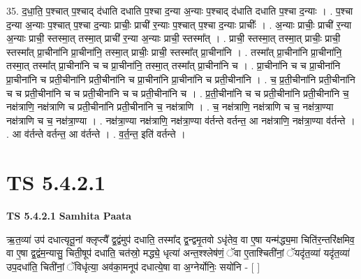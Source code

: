 \documentclass[17pt]{extarticle}
\begin{document}
35. द॒धा॒ति॒ प॒श्चात् प॒श्चाद् द॑धाति दधाति प॒श्चा द॒न्या अ॒न्याः प॒श्चाद् द॑धाति दधाति प॒श्चा द॒न्याः । . प॒श्चा द॒न्या अ॒न्याः प॒श्चात् प॒श्चा द॒न्याः प्राचीः॒ प्राची॑ र॒न्याः प॒श्चात् प॒श्चा द॒न्याः प्राचीः᳚ । . अ॒न्याः प्राचीः॒ प्राची॑ र॒न्या अ॒न्याः प्राची॒ स्तस्मा॒त् तस्मा॒त् प्राची॑ र॒न्या अ॒न्याः प्राची॒ स्तस्मा᳚त् । . प्राची॒ स्तस्मा॒त् तस्मा॒त् प्राचीः॒ प्राची॒ स्तस्मा᳚त् प्रा॒चीना॑नि प्रा॒चीना॑नि॒ तस्मा॒त् प्राचीः॒ प्राची॒ स्तस्मा᳚त् प्रा॒चीना॑नि । . तस्मा᳚त् प्रा॒चीना॑नि प्रा॒चीना॑नि॒ तस्मा॒त् तस्मा᳚त् प्रा॒चीना॑नि च च प्रा॒चीना॑नि॒ तस्मा॒त् तस्मा᳚त् प्रा॒चीना॑नि च । . प्रा॒चीना॑नि च च प्रा॒चीना॑नि प्रा॒चीना॑नि च प्रती॒चीना॑नि प्रती॒चीना॑नि च प्रा॒चीना॑नि प्रा॒चीना॑नि च प्रती॒चीना॑नि । . च॒ प्र॒ती॒चीना॑नि प्रती॒चीना॑नि च च प्रती॒चीना॑नि च च प्रती॒चीना॑नि च च प्रती॒चीना॑नि च । . प्र॒ती॒चीना॑नि च च प्रती॒चीना॑नि प्रती॒चीना॑नि च॒ नक्ष॑त्राणि॒ नक्ष॑त्राणि च प्रती॒चीना॑नि प्रती॒चीना॑नि च॒ नक्ष॑त्राणि । . च॒ नक्ष॑त्राणि॒ नक्ष॑त्राणि च च॒ नक्ष॑त्रा॒ण्या नक्ष॑त्राणि च च॒ नक्ष॑त्रा॒ण्या । . नक्ष॑त्रा॒ण्या नक्ष॑त्राणि॒ नक्ष॑त्रा॒ण्या व॑र्तन्ते वर्तन्त॒ आ नक्ष॑त्राणि॒ नक्ष॑त्रा॒ण्या व॑र्तन्ते । . आ व॑र्तन्ते वर्तन्त॒ आ व॑र्तन्ते । . व॒र्त॒न्त॒ इति॑ वर्तन्ते । \newline
\pagebreak
{}

\section{ TS 5.4.2.1 }

\textbf{TS 5.4.2.1 } \newline
\textbf{Samhita Paata} \newline

ऋ॒त॒व्या॑ उप॑ दधात्यृतू॒नां क्लृप्त्यै᳚ द्व॒द्वंमुप॑ दधाति॒ तस्मा᳚द् द्व॒न्द्वमृ॒तवो ऽधृ॑तेव॒ वा ए॒षा यन्म॑द्ध्य॒मा चिति॑र॒न्तरि॑क्षमिव॒ वा ए॒षा द्व॒द्वंम॒न्यासु॒ चिती॒षूप॑ दधाति॒ चत॑स्रो॒ मद्ध्ये॒ धृत्या॑ अन्त॒श्श्लेष॑णं॒ ॅवा ए॒ताश्चिती॑नां॒ ॅयदृ॑त॒व्या॑ यदृ॑त॒व्या॑ उप॒दधा॑ति॒ चिती॑नां॒ ॅविधृ॑त्या॒ अव॑का॒मनूप॑ दधात्ये॒षा वा अ॒ग्नेर्योनिः॒ सयो॑नि - [  ] \newline
\end{document}
